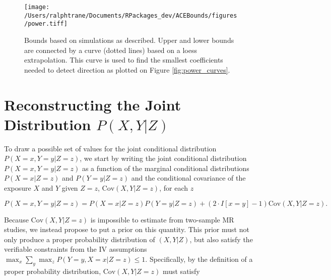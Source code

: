 \documentclass[AMA,STIX1COL,]{WileyNJD-v2}
\begin{document}
\clearpage
\begin{sidewaysfigure}
  \centering
  \texttt{[image: /Users/ralphtrane/Documents/RPackages\_dev/ACEBounds/figures/power.tiff]}
  \caption{Bounds based on simulations as described. Upper and lower bounds are connected by a curve (dotted lines) based on a loess extrapolation. This curve is used to find the smallest coefficients needed to detect direction as plotted on Figure \ref{fig:power_curves}.}
  \label{fig:power}
\end{sidewaysfigure}
\clearpage

\hypertarget{reconstructing-the-joint-distribution-px-y-z}{%
\section{\texorpdfstring{Reconstructing the Joint Distribution
\(P(X, Y | Z)\)}{Reconstructing the Joint Distribution P(X, Y \textbar{} Z)}}\label{reconstructing-the-joint-distribution-px-y-z}}

\label{appendix-quasi-bayesian-details}

To draw a possible set of values for the joint conditional distribution
\(P(X = x, Y = y | Z = z)\), we start by writing the joint conditional
distribution \(P(X = x, Y = y | Z = z)\) as a function of the marginal
conditional distributions \(P(X = x | Z = z)\) and \(P(Y = y | Z = z)\)
and the conditional covariance of the exposure \(X\) and \(Y\) given
\(Z=z\), \(\text{Cov}(X, Y | Z = z)\), for each \(z\)

\begin{equation}
P(X = x, Y = y | Z = z) = P(X = x | Z = z)P(Y = y | Z = z) + (2\cdot I[x = y] - 1)\text{Cov}(X, Y | Z = z). \label{eq:cov-expression}
\end{equation}

Because \(\text{Cov}(X, Y | Z = z)\) is impossible to estimate from
two-sample MR studies, we instead propose to put a prior on this
quantity. This prior must not only produce a proper probability
distribution of \((X,Y|Z)\), but also satisfy the verifiable constraints
from the IV assumptions
\(\max_x \sum_y \max_z P(Y = y, X = x | Z = z) \le 1\). Specifically, by
the definition of a proper probability distribution,
\(\text{Cov}(X, Y | Z = z)\) must satisfy
\end{document}
